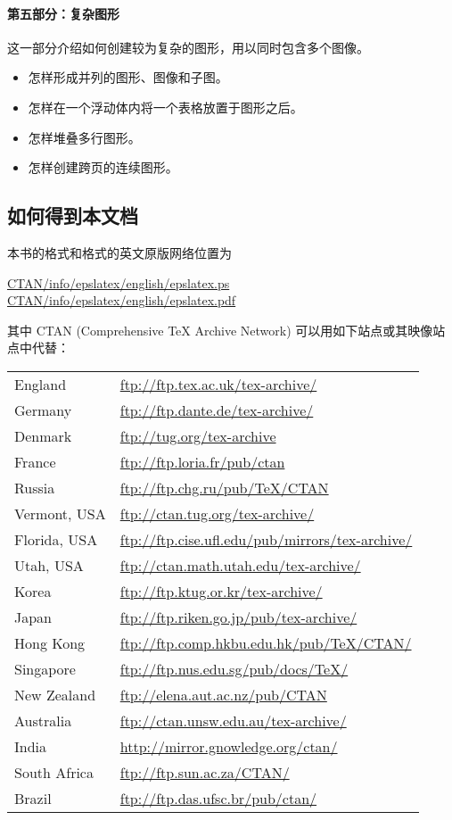 \paragraph{第五部分：复杂图形}
这一部分介绍如何创建较为复杂的图形，用以同时包含多个图像。
\begin{itemize}
	\item 怎样形成并列的图形、图像和子图。
	\item 怎样在一个浮动体内将一个表格放置于图形之后。
	\item 怎样堆叠多行图形。
	\item 怎样创建跨页的连续图形。
\end{itemize}

\subsection*{如何得到本文档}
本书的格式和格式的英文原版网络位置为
\begin{center}
	\href{ftp://ctan.tug.org/tex-archive/info/epslatex/english/epslatex.ps}{CTAN/info/epslatex/english/epslatex.ps}\\
	\href{ftp://ctan.tug.org/tex-archive/info/epslatex/english/epslatex.pdf}{CTAN/info/epslatex/english/epslatex.pdf}
\end{center}
其中 CTAN (Comprehensive \TeX{} Archive Network) 可以用如下站点或其映像站点中代替：
\begin{center}\label{ctan-sites}
	\begin{tabular}{ll}
	England & \url{ftp://ftp.tex.ac.uk/tex-archive/} \\
	Germany & \url{ftp://ftp.dante.de/tex-archive/} \\
	Denmark & \url{ftp://tug.org/tex-archive} \\
	France & \url{ftp://ftp.loria.fr/pub/ctan} \\
	Russia & \url{ftp://ftp.chg.ru/pub/TeX/CTAN} \\
	Vermont, USA & \url{ftp://ctan.tug.org/tex-archive/} \\
	Florida, USA & \url{ftp://ftp.cise.ufl.edu/pub/mirrors/tex-archive/} \\
	Utah, USA & \url{ftp://ctan.math.utah.edu/tex-archive/} \\
	Korea & \url{ftp://ftp.ktug.or.kr/tex-archive/} \\
	Japan & \url{ftp://ftp.riken.go.jp/pub/tex-archive/} \\
	Hong Kong & \url{ftp://ftp.comp.hkbu.edu.hk/pub/TeX/CTAN/} \\
	Singapore & \url{ftp://ftp.nus.edu.sg/pub/docs/TeX/} \\
	New Zealand & \url{ftp://elena.aut.ac.nz/pub/CTAN} \\
	Australia & \url{ftp://ctan.unsw.edu.au/tex-archive/} \\
	India & \url{http://mirror.gnowledge.org/ctan/} \\
	South Africa & \url{ftp://ftp.sun.ac.za/CTAN/} \\
	Brazil & \url{ftp://ftp.das.ufsc.br/pub/ctan/}
	\end{tabular}
\end{center}
